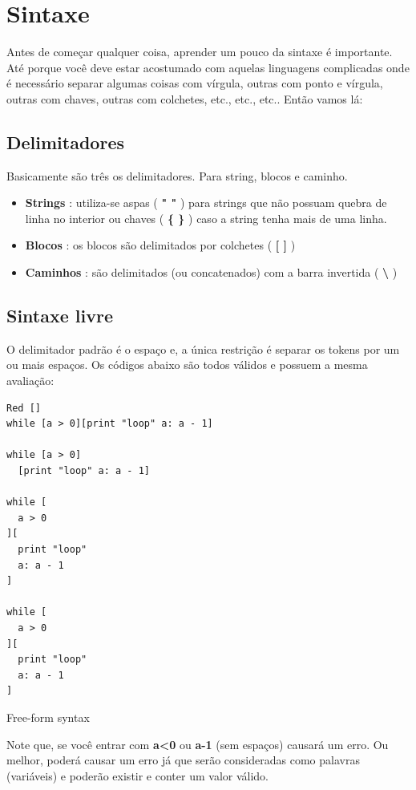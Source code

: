 \documentclass[12pt]{article}
\begin{document}
\section{Sintaxe}

Antes de começar qualquer coisa, aprender um pouco da sintaxe é importante. Até
porque você deve estar acostumado com aquelas linguagens complicadas onde é
necessário separar algumas coisas com vírgula, outras com ponto e vírgula,
outras com chaves, outras com colchetes, etc., etc., etc..
Então vamos lá:

\subsection{Delimitadores}

Basicamente são três os delimitadores. Para string, blocos e caminho.
\begin{itemize}
\item \textbf{Strings} : utiliza-se aspas ( \textbf{" "} ) para strings que não
  possuam quebra de linha no interior ou chaves (\textbf{ \{ \}} ) caso a string
  tenha mais de uma linha. 
\item \textbf{Blocos} : os blocos são delimitados por colchetes ( \textbf{[ ]} )
\item \textbf{Caminhos} : são delimitados (ou concatenados) com a barra
  invertida ( \textbf{\textbackslash} 
)
\end{itemize}

\subsection{Sintaxe livre}
O delimitador padrão é o espaço e, a única restrição é separar os tokens por um
ou mais espaços. Os códigos abaixo são todos válidos e possuem a mesma
avaliação:

\begin{listing}[ht]
\begin{verbatim}
Red []
while [a > 0][print "loop" a: a - 1]

while [a > 0]
  [print "loop" a: a - 1]

while [
  a > 0
][
  print "loop" 
  a: a - 1
]

while [
  a > 0
][
  print "loop" 
  a: a - 1
]
\end{verbatim}
\caption{Free-form syntax}
\label{listing:1}
\end{listing}

Note que, se você entrar com \textbf{a\textless0} ou \textbf{a-1} (sem espaços) causará
um erro. Ou melhor, poderá causar um erro já que serão consideradas como
palavras (variáveis) e poderão existir e conter um valor válido. 
\end{document}
